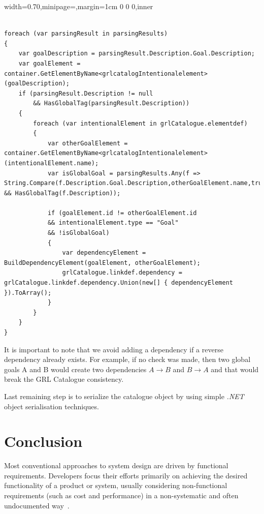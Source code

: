 \documentclass[dissertation,final]{softeng}
\newenvironment{featurecode}[1]
{ \lrbox\featurebox \begin{adjustbox}{width=#1\textwidth,minipage=\textwidth,margin=1cm 0 0 0,inner} }
{ \end{adjustbox}\endlrbox}
\newenvironment{featurelist}[2]
{
\newcommand{\setcaption}{\caption{#1}}
\newcommand{\setlabel}{\label{#2}}
}
{\begin{listing}[h!]\centering\usebox\featurebox\setcaption\setlabel\end{listing}}
\begin{document}
\begin{featurelist}{Translator to GRL -- Add global goals}{lst:translator_to_grl_global_goals}
\begin{featurecode}{0.70}
\begin{verbatim}

foreach (var parsingResult in parsingResults)
{
    var goalDescription = parsingResult.Description.Goal.Description;
    var goalElement = container.GetElementByName<grlcatalogIntentionalelement>(goalDescription);
    if (parsingResult.Description != null 
        && HasGlobalTag(parsingResult.Description))
    {
        foreach (var intentionalElement in grlCatalogue.elementdef)
        {
            var otherGoalElement = container.GetElementByName<grlcatalogIntentionalelement>(intentionalElement.name);
            var isGlobalGoal = parsingResults.Any(f => String.Compare(f.Description.Goal.Description,otherGoalElement.name,true)==0 && HasGlobalTag(f.Description));
        
            if (goalElement.id != otherGoalElement.id 
            && intentionalElement.type == "Goal" 
            && !isGlobalGoal)
            {
                var dependencyElement = BuildDependencyElement(goalElement, otherGoalElement);
                grlCatalogue.linkdef.dependency = grlCatalogue.linkdef.dependency.Union(new[] { dependencyElement }).ToArray();
            }
        }
    }
}
\end{verbatim}
\end{featurecode}
\end{featurelist}
It is important to note that we avoid adding a dependency if a reverse dependency already exists. For example, if no check was made, then two global goals A and B would create two dependencies $A \rightarrow B$ and $B \rightarrow A$ and that would break the GRL Catalogue consistency.

Last remaining step is to serialize the catalogue object by using simple \emph{.NET} object serialisation techniques.

\chapter{Conclusion}
\label{ch:Conclusion}
Most conventional approaches to system design are driven by functional requirements. Developers focus their efforts primarily on achieving the desired functionality of a product or system, usually considering non-functional requirements (such as cost and performance) in a non-systematic and often undocumented way~\citep{Chung2000}.
\end{document}
